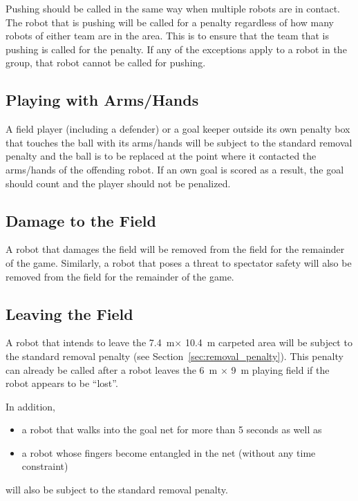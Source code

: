 \documentclass[12pt]{article}
\newcommand{\TotalWidth}{7.4~m\xspace}
\newcommand{\TotalLength}{10.4~m\xspace }
\begin{document}
Pushing should be called in the same way when multiple robots are in contact. The robot that is pushing will be called for a penalty regardless of how many robots of either team are in the area. This is to ensure that the team that is pushing is called for the penalty. If any of the exceptions apply to a robot in the group, that robot cannot be called for pushing.

\subsection{Playing with Arms/Hands}
\label{sec:hand_ball}

A field player (including a defender) or a goal keeper outside its own penalty box that touches the ball with its arms/hands will be subject to the standard removal penalty and the ball is to be replaced at the point where it contacted the arms/hands of the offending robot.  If an own goal is scored as a result, the goal should count and the player should not be penalized.

\subsection{Damage to the Field}
\label{sec:damage}
A robot that damages the field will be removed from the field for the remainder of the game. Similarly, a robot that poses a threat to spectator safety will also be removed from the field for the remainder of the game.

\subsection{Leaving the Field}
\label{sec:leaving_field}

A robot that intends to leave the \TotalWidth $\times$ \TotalLength carpeted area will be subject to the standard removal penalty (see
Section~\ref{sec:removal_penalty}). This penalty can already be called after a robot leaves the 6~m $\times$ 9~m playing field if the robot appears to be ``lost''.

In addition, 
\begin{itemize}
\item a robot that walks into the goal net for more than 5 seconds as well as 
\item a robot whose fingers become entangled in the net (without any time constraint)
\end{itemize}
will also be subject to the standard removal penalty.
\end{document}
